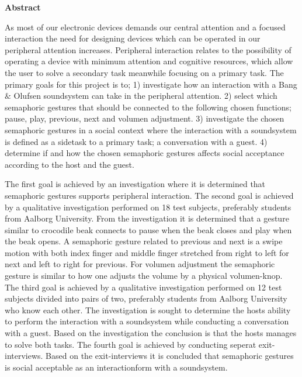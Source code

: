 \begin{center}
	\textbf{{\huge Abstract}}
\end{center}
%
As most of our electronic devices demands our central attention and a focused interaction the need for designing devices which can be operated in our peripheral attention increases. Peripheral interaction relates to the possibility of operating a device with minimum attention and cognitive resources, which allow the user to solve a secondary task meanwhile focusing on a primary task. The primary goals for this project is to; 1) investigate how an interaction with a Bang $\&$ Olufsen soundsystem can take in the peripheral attention. 2) select which semaphoric gestures that should be connected to the following chosen functions; pause, play, previous, next and volumen adjustment. 3) investigate the chosen semaphoric gestures in a social context where the interaction with a soundsystem is defined as a sidetask to a primary task; a conversation with a guest. 4) determine if and how the chosen semaphoric gestures affects social acceptance according to the host and the guest.            

The first goal is achieved by an investigation where it is determined that semaphoric gestures supports peripheral interaction. The second goal is achieved by a qualitative investigation performed on 18 test subjects, preferably students from Aalborg University. From the investigation it is determined that a gesture similar to crocodile beak connects to pause when the beak closes and play when the beak opens. A semaphoric gesture related to previous and next is a swipe motion with both index finger and middle finger stretched from right to left for next and left to right for previous. For volumen adjustment the semaphoric gesture is similar to how one adjusts the volume by a physical volumen-knop. The third goal is achieved by a qualitative investigation performed on 12 test subjects divided into pairs of two, preferably students from Aalborg University who know each other. The investigation is sought to determine the hosts ability to perform the interaction with a soundsystem while conducting a conversation with a guest. Based on the investigation the conclusion is that the hosts manages to solve both tasks. The fourth goal is achieved by conducting seperat exit-interviews. Based on the exit-interviews it is concluded that semaphoric gestures is social acceptable as an interactionform with a soundsystem.